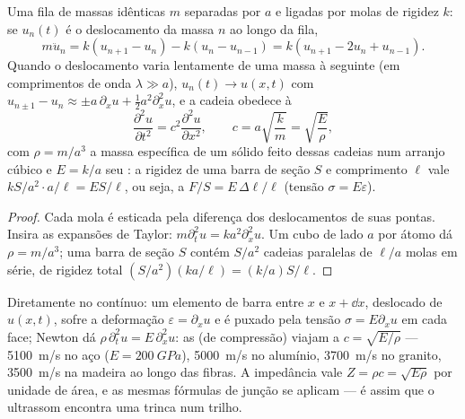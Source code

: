 \begin{proposition}\label{prop:b2:waves-on-strings:chain}
Uma fila de massas idênticas $m$ separadas por $a$ e ligadas por molas de
rigidez $k$: se $u_n(t)$ é o deslocamento da massa $n$ ao longo da
fila,
\[
m\ddot u_n = k(u_{n+1} - u_n) - k(u_n - u_{n-1}) = k(u_{n+1} - 2u_n + u_{n-1}) .
\]
Quando o deslocamento varia lentamente de uma massa à seguinte (em
comprimentos de onda $\lambda \gg a$), $u_n(t) \to u(x, t)$ com $u_{n\pm1} - u_n \approx
\pm a\,\partial_xu + \tfrac12a^2\partial_x^2u$, e a cadeia obedece à 
\[
\frac{\partial^2u}{\partial t^2} = c^2\frac{\partial^2u}{\partial x^2} , \qquad
c = a\sqrt{\frac km} = \sqrt{\frac{E}{\rho}} ,
\]
com $\rho = m/a^3$ a massa específica de um sólido feito dessas cadeias num
arranjo cúbico e $E = k/a$ seu \emph{}: a rigidez de
uma barra de seção $S$ e comprimento $\ell$ vale $kS/a^2\cdot a/\ell = ES/\ell$,
ou seja, a \emph{} $F/S = E\,\Delta\ell/\ell$ (tensão $\sigma = E\varepsilon$).
\end{proposition}

\begin{proof}
Cada mola é esticada pela diferença dos deslocamentos de suas
pontas. Insira as expansões de Taylor: $m\partial_t^2u = ka^2\partial_x^2u$. Um cubo de
lado $a$ por átomo dá $\rho = m/a^3$; uma barra de seção $S$ contém
$S/a^2$ cadeias paralelas de $\ell/a$ molas em série, de rigidez total
$(S/a^2)(ka/\ell) = (k/a)S/\ell$.
\end{proof}

\begin{proposition}\label{prop:b2:waves-on-strings:rod}
Diretamente no contínuo: um elemento de barra entre $x$ e $x +
\dd x$, deslocado de $u(x, t)$, sofre a deformação $\varepsilon = \partial_xu$ e é puxado
pela tensão $\sigma = E\partial_xu$ em cada face; Newton dá $\rho\,\partial_t^2u =
E\,\partial_x^2u$: as  (de compressão) viajam a $c = \sqrt{E/\rho}$
--- \qty{5100}{m/s} no aço ($E = \qty{200}{GPa}$), \qty{5000}{m/s} no alumínio,
\qty{3700}{m/s} no granito, \qty{3500}{m/s} na madeira ao longo das fibras. A
impedância vale $Z = \rho c = \sqrt{E\rho}$ por unidade de área, e as mesmas
fórmulas de junção se aplicam --- é assim que o ultrassom encontra uma trinca num
trilho.
\end{proposition}

